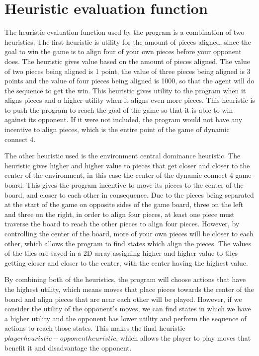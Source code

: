\documentclass[11pt]{scrartcl}
\begin{document}
\section{Heuristic evaluation function}
The heuristic evaluation function used by the program is a combination of two heuristics. The first heuristic is utility for the amount of pieces aligned, since the goal to win the game is to align four of your own pieces before your opponent does. The heuristic gives value based on the amount of pieces aligned. The value of two pieces being aligned is 1 point, the value of three pieces being aligned is 3 points and the value of four pieces being aligned is 1000, so that the agent will do the sequence to get the win. This heuristic gives utility to the program when it aligns pieces and a higher utility when it aligns even more pieces. This heuristic is to push the program to reach the goal of the game so that it is able to win against its opponent. If it were not included, the program would not have any incentive to align pieces, which is the entire point of the game of dynamic connect 4.

The other heuristic used is the environment central dominance heuristic. The heuristic gives higher and higher value to pieces that get closer and closer to the center of the 
environment, in this case the center of the dynamic connect 4 game board. This gives the program incentive to move its pieces to the center of the board, and closer to each other in consequence. Due to the pieces being separated at the start of the game on opposite sides of the game board, three on the left and three on the right, in order to align four pieces, at least one piece must traverse the board to reach the other pieces to align four pieces. However, by controlling the center of the board, more of your own pieces will be closer to each other, which allows the program to find states which align the pieces. The values of the tiles are saved in a 2D array assigning higher and higher value to tiles getting closer and closer to the center, with the center having the highest value.

By combining both of the heuristics, the program will choose actions that have the highest utility, which means moves that place pieces towards the center of the board and align pieces that are near each other will be played. However, if we consider the utility of the opponent's moves, we can find states in which we have a higher utility and the opponent has lower utility and perform the sequence of actions to reach those states. This makes the final heuristic $ player heuristic - opponent heuristic $, which allows the player to play moves that benefit it and disadvantage the opponent. 
\end{document}
